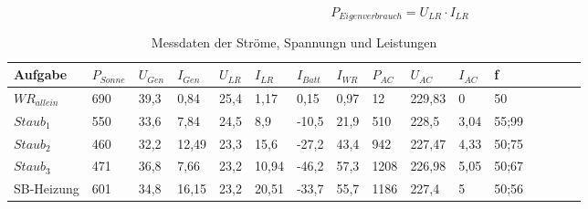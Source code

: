 \begin{equation}
	P_{ Eigenverbrauch }= U_{ LR} \cdot I_{ LR }
\label{eq:230509_Eigenverbrauch}
\end{equation} 


\begin{table}[!ht]
    \caption{Messdaten der Ströme, Spannungn und Leistungen }
	\centering
    \begin{tabular}{|l|l|l|l|l|l|l|l|l|l|l|l|l|l|l|l|}
    \hline
        Aufgabe & $P_{Sonne}$ & $U_{Gen}$ & $I_{Gen}$ & $U_{LR}$ & $I_{LR}$ & $I_{Batt}$ & $I_{WR}$ & $P_{AC}$ & $U_{AC}$ & $I_{AC}$ & f \\ \hline
        ${WR}_{allein}$ & 690 & 39,3 & 0,84 & 25,4 & 1,17 & 0,15 & 0,97 & 12 & 229,83 & 0 & 50 \\ \hline
        $Staub_{1}$ & 550 & 33,6 & 7,84 & 24,5 & 8,9 & -10,5 & 21,9 & 510 & 228,5 & 3,04 & 55;99  \\ \hline
        $Staub_{2}$ & 460 & 32,2 & 12,49 & 23,3 & 15,6 & -27,2 & 43,4 & 942 & 227,47 & 4,33 & 50;75 \\ \hline
        $Staub_{3}$ & 471 & 36,8 & 7,66 & 23,2 & 10,94 & -46,2 & 57,3 & 1208 & 226,98 & 5,05 & 50;67 \\ \hline
        SB-Heizung & 601 & 34,8 & 16,15 & 23,2 & 20,51 & -33,7 & 55,7 & 1186 & 227,4 & 5 & 50;56 \\ \hline
    \end{tabular}
	\label{tab:230512_Messtabelle}
\end{table}

